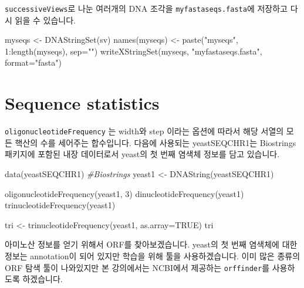 \documentclass[
]{book}
\newenvironment{Shaded}{\begin{snugshade}}{\end{snugshade}}
\newcommand{\AttributeTok}[1]{\textcolor[rgb]{0.77,0.63,0.00}{#1}}
\newcommand{\CommentTok}[1]{\textcolor[rgb]{0.56,0.35,0.01}{\textit{#1}}}
\newcommand{\ConstantTok}[1]{\textcolor[rgb]{0.00,0.00,0.00}{#1}}
\newcommand{\DecValTok}[1]{\textcolor[rgb]{0.00,0.00,0.81}{#1}}
\newcommand{\FunctionTok}[1]{\textcolor[rgb]{0.00,0.00,0.00}{#1}}
\newcommand{\NormalTok}[1]{#1}
\newcommand{\OtherTok}[1]{\textcolor[rgb]{0.56,0.35,0.01}{#1}}
\newcommand{\SpecialCharTok}[1]{\textcolor[rgb]{0.00,0.00,0.00}{#1}}
\newcommand{\StringTok}[1]{\textcolor[rgb]{0.31,0.60,0.02}{#1}}
\begin{document}
\texttt{successiveViews}로 나눈 여러개의 DNA 조각을 \texttt{myfastaseqs.fasta}에 저장하고 다시 읽을 수 있습니다.

\begin{Shaded}
\begin{Highlighting}[]

\NormalTok{myseqs }\OtherTok{\textless{}{-}} \FunctionTok{DNAStringSet}\NormalTok{(sv)}
\FunctionTok{names}\NormalTok{(myseqs) }\OtherTok{\textless{}{-}} \FunctionTok{paste}\NormalTok{(}\StringTok{"myseqs"}\NormalTok{, }\DecValTok{1}\SpecialCharTok{:}\FunctionTok{length}\NormalTok{(myseqs), }\AttributeTok{sep=}\StringTok{""}\NormalTok{)}
\FunctionTok{writeXStringSet}\NormalTok{(myseqs, }\StringTok{"myfastaseqs.fasta"}\NormalTok{, }\AttributeTok{format=}\StringTok{"fasta"}\NormalTok{)}
\end{Highlighting}
\end{Shaded}

\hypertarget{sequence-statistics}{%
\section{Sequence statistics}\label{sequence-statistics}}

\texttt{oligonucleotideFrequency} 는 width와 step 이라는 옵션에 따라서 해당 서열의 모든 핵산의 수를 세어주는 합수입니다. 다음에 사용되는 yeastSEQCHR1는 Biostrings 패키지에 포함된 내장 데이터로서 yeast의 첫 번째 염색체 정보를 담고 있습니다.

\begin{Shaded}
\begin{Highlighting}[]
\FunctionTok{data}\NormalTok{(yeastSEQCHR1) }\CommentTok{\#Biostrings}
\NormalTok{yeast1 }\OtherTok{\textless{}{-}} \FunctionTok{DNAString}\NormalTok{(yeastSEQCHR1)}

\FunctionTok{oligonucleotideFrequency}\NormalTok{(yeast1, }\DecValTok{3}\NormalTok{)}
\FunctionTok{dinucleotideFrequency}\NormalTok{(yeast1)}
\FunctionTok{trinucleotideFrequency}\NormalTok{(yeast1)}

\NormalTok{tri }\OtherTok{\textless{}{-}} \FunctionTok{trinucleotideFrequency}\NormalTok{(yeast1, }\AttributeTok{as.array=}\ConstantTok{TRUE}\NormalTok{)}
\NormalTok{tri}
\end{Highlighting}
\end{Shaded}

아미노산 정보를 얻기 위해서 ORF를 찾아보겠습니다. yeast의 첫 번째 염색체에 대한 정보는 annotation이 되어 있지만 학습을 위해 툴을 사용하겠습니다. 이미 많은 종류의 ORF 탐색 툴이 나와있지만 본 강의에서는 NCBI에서 제공하는 \texttt{orffinder}를 사용하도록 하겠습니다.
\end{document}
